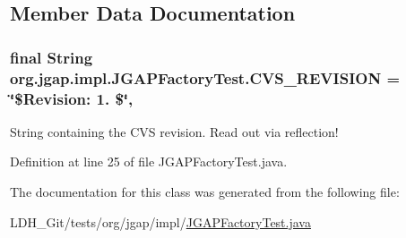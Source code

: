 \subsection{Member Data Documentation}
\hypertarget{classorg_1_1jgap_1_1impl_1_1_j_g_a_p_factory_test_af0690b96d231254944716670742b2148}{
\subsubsection[{C\-V\-S\-\_\-\-R\-E\-V\-I\-S\-I\-O\-N}]{\setlength{\rightskip}{0pt plus 5cm}final String org.\-jgap.\-impl.\-J\-G\-A\-P\-Factory\-Test.\-C\-V\-S\-\_\-\-R\-E\-V\-I\-S\-I\-O\-N = \char`\"{}\$Revision\-: 1. \$\char`\"{}\hspace{0.3cm}{\ttfamily [static]}, {\ttfamily [private]}}}\label{classorg_1_1jgap_1_1impl_1_1_j_g_a_p_factory_test_af0690b96d231254944716670742b2148}
String containing the C\-V\-S revision. Read out via reflection! 

Definition at line 25 of file J\-G\-A\-P\-Factory\-Test.\-java.



The documentation for this class was generated from the following file\-:\begin{DoxyCompactItemize}
\item 
L\-D\-H\-\_\-\-Git/tests/org/jgap/impl/\hyperlink{_j_g_a_p_factory_test_8java}{J\-G\-A\-P\-Factory\-Test.\-java}\end{DoxyCompactItemize}
